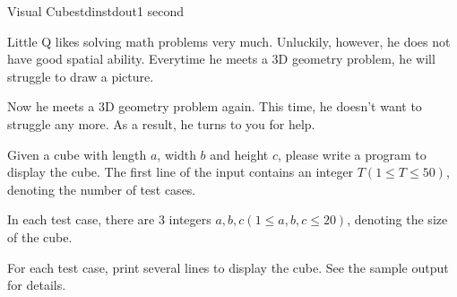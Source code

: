 \documentclass[11pt,a4paper,oneside]{article}
\newcommand{\timeLimit}{2 seconds}
\renewcommand{\defaultmemorylimit}{512 megabytes}
\begin{document}
\renewcommand{\timeLimit}{1 second}
\renewcommand{\defaultmemorylimit}{512 megabytes}
\begin{problem}{Visual Cube}{stdin}{stdout}{\timeLimit}

Little Q likes solving math problems very much. Unluckily, however, he does not have good spatial ability. Everytime he meets a 3D geometry problem, he will struggle to draw a picture.\par
Now he meets a 3D geometry problem again. This time, he doesn't want to struggle any more. As a result, he turns to you for help.\par
Given a cube with length $a$, width $b$ and height $c$, please write a program to display the cube.
\InputFile
The first line of the input contains an integer $T(1\leq T\leq50)$, denoting the number of test cases.\par
In each test case, there are $3$ integers $a,b,c(1\leq a,b,c\leq 20)$, denoting the size of the cube.\par
\OutputFile
For each test case, print several lines to display the cube. See the sample output for details.

\Examples
\begin{example}
%
\end{example}
\end{problem}
\renewcommand{\timeLimit}{2 seconds}
\renewcommand{\defaultmemorylimit}{512 megabytes}
\end{document}
